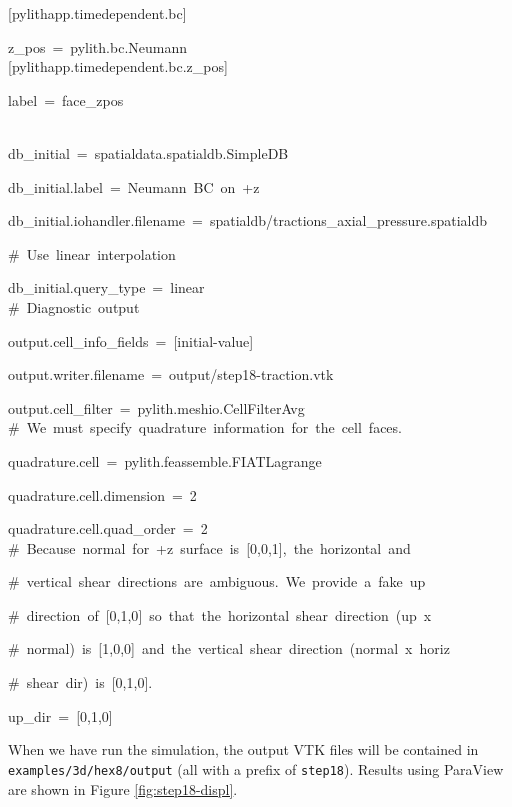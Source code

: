 \begin{lyxcode}
{[}pylithapp.timedependent.bc{]}

z\_pos~=~pylith.bc.Neumann~\\


{[}pylithapp.timedependent.bc.z\_pos{]}

label~=~face\_zpos

~\\
db\_initial~=~spatialdata.spatialdb.SimpleDB

db\_initial.label~=~Neumann~BC~on~+z

db\_initial.iohandler.filename~=~spatialdb/tractions\_axial\_pressure.spatialdb

\#~Use~linear~interpolation

db\_initial.query\_type~=~linear~\\


\#~Diagnostic~output

output.cell\_info\_fields~=~{[}initial-value{]}

output.writer.filename~=~output/step18-traction.vtk

output.cell\_filter~=~pylith.meshio.CellFilterAvg~\\


\#~We~must~specify~quadrature~information~for~the~cell~faces.

quadrature.cell~=~pylith.feassemble.FIATLagrange

quadrature.cell.dimension~=~2

quadrature.cell.quad\_order~=~2~\\


\#~Because~normal~for~+z~surface~is~{[}0,0,1{]},~the~horizontal~and

\#~vertical~shear~directions~are~ambiguous.~We~provide~a~\textquotedbl{}fake\textquotedbl{}~up

\#~direction~of~{[}0,1,0{]}~so~that~the~horizontal~shear~direction~(\textquotedbl{}up\textquotedbl{}~x

\#~normal)~is~{[}1,0,0{]}~and~the~vertical~shear~direction~(normal~x~horiz

\#~shear~dir)~is~{[}0,1,0{]}.

up\_dir~=~{[}0,1,0{]}
\end{lyxcode}
When we have run the simulation, the output VTK files will be contained
in \texttt{examples/3d/hex8/output} (all with a prefix of \texttt{step18}).
Results using ParaView are shown in Figure \ref{fig:step18-displ}.

